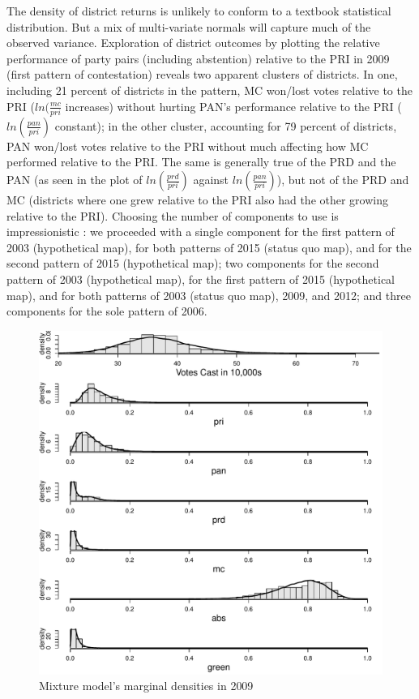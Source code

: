 \documentclass[letter,12pt]{article}
\begin{document}
The density of district returns is unlikely to conform to a textbook statistical distribution. But a mix of multi-variate normals will capture much of the observed variance. Exploration of district outcomes by plotting the relative performance of party pairs (including abstention) relative to the PRI in 2009 (first pattern of contestation) reveals two apparent clusters of districts. In one, including 21 percent of districts in the pattern, MC won/lost votes relative to the PRI ($ln(\frac{mc}{pri}$ increases) without hurting PAN's performance relative to the PRI ($ln(\frac{pan}{pri})$ constant); in the other cluster, accounting for 79 percent of districts, PAN won/lost votes relative to the PRI without much affecting how MC performed relative to the PRI. The same is generally true of the PRD and the PAN (as seen in the plot of $ln(\frac{prd}{pri})$ against $ln(\frac{pan}{pri})$), but not of the PRD and MC (districts where one grew relative to the PRI also had the other growing relative to the PRI). Choosing the number of components to use is impressionistic \citep[][:405]{linzerSeatVoteElasticity2012}: we proceeded with a single component for the first pattern of 2003 (hypothetical map), for both patterns of 2015 (status quo map), and for the second pattern of 2015 (hypothetical map); two components for the second pattern of 2003 (hypothetical map), for the first pattern of 2015 (hypothetical map), and for both patterns of 2003 (status quo map), 2009, and 2012; and three components for the sole pattern of 2006.

\begin{figure}
\centering 
  \includegraphics[width=.7\columnwidth]{linzerMg2009.pdf} 
  \caption{Mixture model's marginal densities in 2009}\label{F:linzerMg}
\end{figure}
\end{document}
